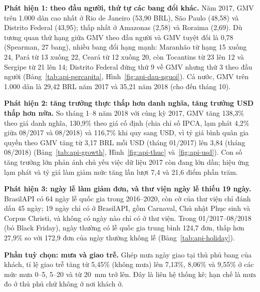 \textbf{Phát hiện 1: theo đầu người, thứ tự các bang đổi khác.} Năm 2017, GMV trên 1.000 dân cao nhất ở Rio de Janeiro (53,90 BRL), São Paulo (48,58) và Distrito Federal (43,95); thấp nhất ở Amazonas (2,58) và Roraima (2,69). Dù tương quan thứ hạng giữa GMV theo đầu người và GMV tuyệt đối là 0,78 (Spearman, 27 bang), nhiều bang đổi hạng mạnh: Maranhão từ hạng 15 xuống 24, Pará từ 13 xuống 22, Ceará từ 12 xuống 20, còn Tocantins từ 23 lên 12 và Sergipe từ 21 lên 14; Distrito Federal đứng thứ 9 về GMV nhưng thứ 3 theo đầu người (Bảng~\ref{tab:api-percapita}, Hình~\ref{fig:api-dau-nguoi}). Cả nước, GMV trên 1.000 dân là 29,42 BRL năm 2017 và 35,21 năm 2018 (cho đến tháng 10).


\textbf{Phát hiện 2: tăng trưởng thực thấp hơn danh nghĩa, tăng trưởng USD thấp hơn nữa.} So tháng 1--8 năm 2018 với cùng kỳ 2017, GMV tăng 138,3\% theo giá danh nghĩa, 130,9\% theo giá cố định (chia chỉ số IPCA, lạm phát 4,2\% giữa 08/2017 và 08/2018) và 116,7\% khi quy sang USD, vì tỷ giá bình quân gia quyền theo GMV tăng từ 3,17 BRL mỗi USD (tháng 01/2017) lên 3,84 (tháng 08/2018) (Bảng~\ref{tab:api-growth}, Hình~\ref{fig:api-thuc} và~\ref{fig:api-usd}). Con số tăng trưởng lớn phản ánh chủ yếu việc dữ liệu 2017 còn đang lớn dần; hiệu ứng lạm phát và tỷ giá làm giảm mức tăng lần lượt 7,4 và 21,6 điểm phần trăm.


\textbf{Phát hiện 3: ngày lễ làm giảm đơn, và thư viện ngày lễ thiếu 19 ngày.} BrasilAPI có 64 ngày lễ quốc gia trong 2016--2020, còn cờ  của thư viện  chỉ đánh dấu 45 ngày; 19 ngày chỉ có ở BrasilAPI, gồm Carnaval, Chủ nhật Phục sinh và Corpus Christi, và không có ngày nào chỉ có ở thư viện. Trong 01/2017--08/2018 (bỏ Black Friday), ngày thường có lễ quốc gia trung bình 124,7 đơn, thấp hơn 27,9\% so với 172,9 đơn của ngày thường không lễ (Bảng~\ref{tab:api-holiday}).


\textbf{Phần tuỳ chọn: mưa và giao trễ.} Ghép mưa ngày giao tại thủ phủ bang của khách, tỉ lệ giao trễ tăng từ 5,45\% (không mưa) lên 7,13\%, 8,06\% và 9,55\% ở các mức mưa 0--5, 5--20 và từ 20~mm trở lên. Đây là liên hệ thống kê; hạn chế là mưa đo ở thủ phủ chứ không ở nơi khách ở.

